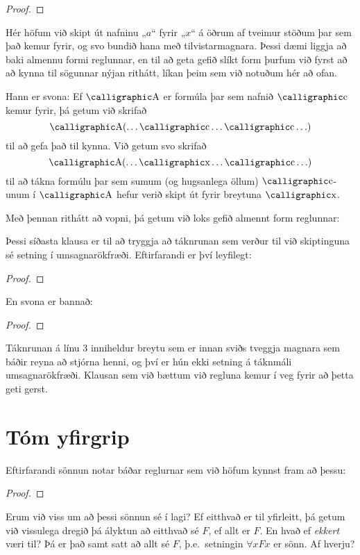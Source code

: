 \begin{proof}
	 
\end{proof}
Hér höfum við skipt út nafninu „$a$“ fyrir $„x“$ á öðrum af tveimur stöðum þar sem það kemur fyrir, og svo bundið hana með tilvistarmagnara. Þessi dæmi liggja að baki almennu formi reglunnar, en til að geta gefið slíkt form þurfum við fyrst að að kynna til sögunnar nýjan rithátt, líkan þeim sem við notuðum hér að ofan.

Hann er svona: Ef $\meta{A}$ er formúla þar sem nafnið $\meta{c}$ kemur fyrir, þá getum við skrifað $$\meta{A}(\ldots \meta{c} \ldots \meta{c}\ldots)$$ til að gefa það til kynna. Við getum svo skrifað $$\meta{A}(\ldots \meta{x} \ldots \meta{c}\ldots)$$ til að tákna formúlu þar sem sumum (og hugsanlega öllum) $\meta{c}$-unum í
$\meta{A}$ hefur verið skipt út fyrir breytuna $\meta{x}$.

Með þennan rithátt að vopni, þá getum við loks gefið almennt form reglunnar:

Þessi síðasta klausa er til að tryggja að táknrunan sem verður til við skiptinguna sé setning í umsagnarökfræði. Eftirfarandi er því leyfilegt:
\begin{proof}
	 
	 
\end{proof}
En svona er bannað:
\begin{proof}
	 
\end{proof}
Táknrunan á línu 3 inniheldur breytu sem er innan sviðs tveggja magnara sem báðir reyna að stjórna henni, og því er hún ekki setning á táknmáli umsagnarökfræði. Klausan sem við bættum við regluna kemur í veg fyrir að þetta geti gerst.

\section{Tóm yfirgrip}\label{tomtyfirgrip}
Eftirfarandi sönnun notar báðar reglurnar sem við höfum kynnst fram að þessu:
	\begin{proof}
	\end{proof}
Erum við viss um að þessi sönnun sé í lagi? Ef eitthvað er til yfirleitt, þá getum við vissulega dregið þá ályktun að eitthvað sé $F$, ef allt er $F$. En hvað ef \emph{ekkert} væri til? Þá er það samt satt að allt sé $F$, þ.e.\ setningin $\forall x Fx$ er sönn. Af hverju?

